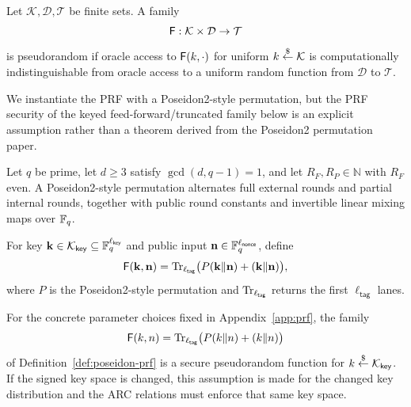 \begin{definition}\label{def:prf}
Let $\mathcal K,\mathcal D,\mathcal T$ be finite sets.  A family
\[
  \mathsf{F}:\mathcal K\times \mathcal D\to \mathcal T
\]
is pseudorandom if oracle access to $\mathsf{F}(k,\cdot)$ for uniform $k\overset{\$}{\leftarrow}\mathcal K$ is computationally
indistinguishable from oracle access to a uniform random function from $\mathcal D$ to $\mathcal T$.
\end{definition}

We instantiate the PRF with a Poseidon2-style permutation, but the PRF security of the keyed
feed-forward/truncated family below is an explicit assumption rather than a theorem derived from the
Poseidon2 permutation paper.

\begin{definition}\label{def:poseidon-perm}
Let $q$ be prime, let $d\ge 3$ satisfy $\gcd(d,q-1)=1$, and let $R_F,R_P\in\mathbb N$ with $R_F$ even.  A
Poseidon2-style permutation alternates full external rounds and partial internal rounds, together with public
round constants and invertible linear mixing maps over $\mathbb{F}_q$.
\end{definition}

\begin{definition}\label{def:poseidon-prf}
For key $\mathbf{k}\in\mathcal K_{\mathsf{key}}\subseteq\mathbb{F}_q^{\ell_{\mathsf{key}}}$ and public input
$\mathbf{n}\in\mathbb{F}_q^{\ell_{\mathsf{nonce}}}$, define
\[
  \mathsf{F}(\mathbf{k},\mathbf{n})=\mathrm{Tr}_{\ell_{\mathsf{tag}}}\bigl(P(\mathbf{k}\Vert\mathbf{n})+(\mathbf{k}\Vert\mathbf{n})\bigr),
\]
where $P$ is the Poseidon2-style permutation and $\mathrm{Tr}_{\ell_{\mathsf{tag}}}$ returns the first
$\ell_{\mathsf{tag}}$ lanes.
\end{definition}

\begin{assumption}\label{ass:poseidon-prf}
For the concrete parameter choices fixed in Appendix~\ref{app:prf}, the family
\[
  \mathsf{F}(k,n)=\mathrm{Tr}_{\ell_{\mathsf{tag}}}\bigl(P(k\Vert n)+(k\Vert n)\bigr)
\]
of Definition~\ref{def:poseidon-prf} is a secure pseudorandom function for
$k\overset{\$}{\leftarrow}\mathcal K_{\mathsf{key}}$.  If the signed key space is changed, this assumption is made for the
changed key distribution and the ARC relations must enforce that same key space.
\end{assumption}
